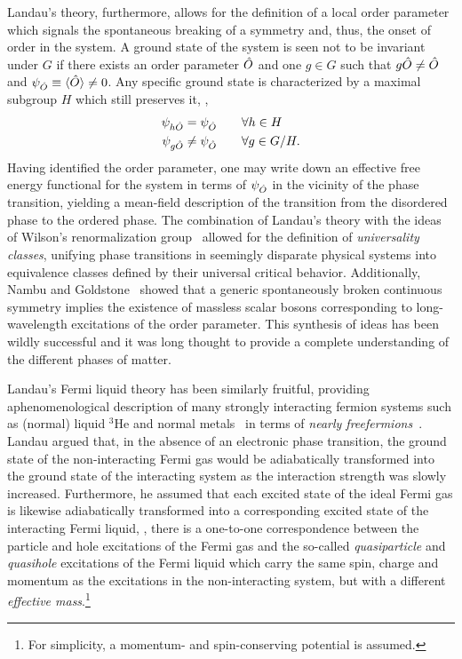 Landau's theory, furthermore, allows for the definition of a local order parameter which signals the spontaneous breaking of a symmetry and, thus, the onset of order in the system.
A ground state of the system is seen not to be invariant under $G$ if there exists an order parameter $\hat{O}$ and one $g \in G$ such that $g \hat{O} \neq \hat{O}$ and $\psi_{\hat{O}} \equiv \langle \hat{O} \rangle \neq 0$.
Any specific ground state is characterized by a maximal subgroup $H$ which still preserves it, \ie,
%
\begin{align}
	\psi_{h \hat{O}} &= \psi_{\hat{O}} \qquad \forall h \in H \nonumber\\
	\psi_{g \hat{O}} &\neq \psi_{\hat{O}} \qquad \forall g \in G/H.
\end{align}
%
Having identified the order parameter, one may write down an effective free energy functional for the system in terms of $\psi_{\hat{O}}$ in the vicinity of the phase transition, yielding a mean-field description of the transition from the disordered phase to the ordered phase. 
The combination of Landau's theory with the ideas of Wilson's renormalization group~\cite{WilsonPRB1971I,WilsonPRB1971II,WilsonPRL1972,WilsonRMP1975} allowed for the definition of \textit{universality classes}, unifying phase transitions in seemingly disparate physical systems into equivalence classes defined by their universal critical behavior.
Additionally, Nambu and Goldstone~\cite{NambuPRL1960,GoldstoneINC1961} showed that a generic spontaneously broken continuous symmetry implies the existence of massless scalar bosons corresponding to long-wavelength excitations of the order parameter.
This synthesis of ideas has been wildly successful and it was long thought to provide a complete understanding of the different phases of matter.

Landau's Fermi liquid theory has been similarly fruitful, providing a\linebreak phenomenological description of many strongly interacting fermion systems such as (normal) liquid $^3$He and normal metals~\cite{SilinJETP1958,SilinJETP1959} in terms of \textit{nearly free}\linebreak \textit{fermions}~\cite{Leggett2006}.
Landau argued that, in the absence of an electronic phase transition, the ground state of the non-interacting Fermi gas would be adiabatically transformed into the ground state of the interacting system as the interaction strength was slowly increased.
Furthermore, he assumed that each excited state of the ideal Fermi gas is likewise adiabatically transformed into a corresponding excited state of the interacting Fermi liquid, \ie, there is a one-to-one correspondence between the particle and hole excitations of the Fermi gas and the so-called \textit{quasiparticle} and \textit{quasihole} excitations of the Fermi liquid which carry the same spin, charge and momentum as the excitations in the non-interacting system, but with a different \textit{effective mass}.\footnote{For simplicity, a momentum- and spin-conserving potential is assumed.}

